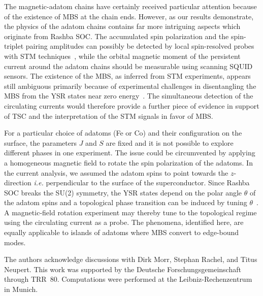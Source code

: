 \documentclass[aps,prl,reprint,nobibnotes]{revtex4-1}
\begin{document}
The magnetic-adatom chains have certainly received particular attention because of the existence of MBS at the chain ends. However, as our results demonstrate, the physics of the adatom chains contains far more intriguing aspects which originate from Rashba SOC. The accumulated spin polarization and the spin-triplet pairing amplitudes can possibly be detected by local spin-resolved probes with STM techniques~\cite{2017arXiv170100822G}, while the orbital magnetic moment of the persistent current around the adatom chains should be measurable using scanning SQUID sensors. The existence of the MBS, as inferred from STM experiments, appears still ambiguous primarily because of experimental challenges in disentangling the MBS from the YSR states near zero energy~\cite{1402-4896-2015-T164-014008}. The simultaneous detection of the circulating currents would therefore provide a further piece of evidence in support of TSC and the interpretation of the STM signals in favor of MBS.

For a particular choice of adatoms (Fe or Co) and their configuration on the surface, the parameters $J$ and $S$ are fixed and it is not possible to explore different phases in one experiment. The issue could be circumvented by applying a homogeneous magnetic field to rotate the spin polarization of the adatoms. In the current analysis, we assumed the adatom spins to point towards the $z$-direction \textit{i.e.} perpendicular to the surface of the superconductor. Since Rashba SOC breaks the SU(2) symmetry, the YSR states depend on the polar angle $\theta$ of the adatom spins and a topological phase transition can be induced by tuning $\theta$~\cite{PhysRevLett.114.236804,Loder2015}. A magnetic-field rotation experiment may thereby tune to the topological regime using the circulating current as a probe. The phenomena, identified here, are equally applicable to islands of adatoms where MBS convert to edge-bound modes.

The authors acknowledge discussions with Dirk Morr, Stephan Rachel, and Titus Neupert. This work was supported by the Deutsche Forschungsgemeinschaft through TRR~80. Computations were performed at the Leibniz-Rechenzentrum in Munich.



%
%
\end{document}

